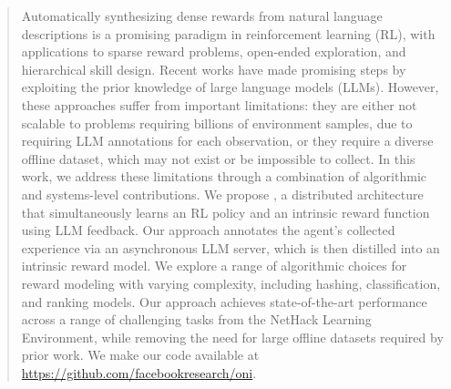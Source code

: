 \begin{abstract}
Automatically synthesizing dense rewards from natural language descriptions is a promising paradigm in reinforcement learning (RL), with applications to sparse reward problems, open-ended exploration, and hierarchical skill design. Recent works have made promising steps by exploiting the prior knowledge of large language models (LLMs). 
However, these approaches suffer from important limitations: they are either not scalable to problems requiring billions of environment samples, due to requiring LLM annotations for each observation, or they require a diverse offline dataset, which may not exist or be impossible to collect. 
In this work, we address these limitations through a combination of algorithmic and systems-level contributions. We propose \oni, a distributed architecture that simultaneously learns an RL policy and an intrinsic reward function using LLM feedback. Our approach annotates the agent's collected experience via an asynchronous LLM server,  which is then distilled into an intrinsic reward model. We explore a range of algorithmic choices for reward modeling with varying complexity, including hashing, classification, and ranking models. 
%
%
Our approach achieves state-of-the-art performance across a range of challenging tasks from the NetHack Learning Environment, while removing the need for large offline datasets required by prior work.
We make our code available at %
 \url{https://github.com/facebookresearch/oni}. 
\end{abstract}


%
%
%
%
